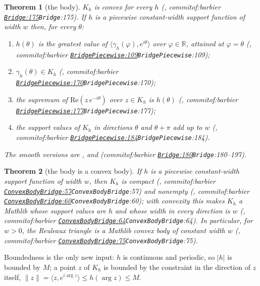 \documentclass[11pt]{article}
\newtheorem{theorem}{Theorem}
\theoremstyle{definition}
\theoremstyle{remark}
\newcommand{\RR}{\mathbb{R}}
\newcommand{\commitof}[1]{\csname commitof:#1\endcsname}
\newcommand{\repo}[1]{https://github.com/jpbald93/#1}
\newcommand{\src}[4]{\ifcsname commitof:#1\endcsname
  \href{\repo{#1}/blob/\commitof{#1}/#2/#3.lean\#L#4}{\texttt{#3}:#4}\else\texttt{#3}:#4\fi}
\begin{document}
\begin{theorem}[the body]\label{thm:body}
$K_h$ is convex for every $h$ (, \src{barbier}{Barbier}{Bridge}{175}). If $h$
is a piecewise constant-width support function of width $w$ then, for every $\theta$:
\begin{enumerate}
\item[(a)] $h(\theta)$ is the greatest value of $\langle\gamma_h(\varphi), e^{i\theta}\rangle$ over
$\varphi\in\RR$, attained at $\varphi = \theta$ (, \src{barbier}{Barbier}{BridgePiecewise}{109});
\item[(b)] $\gamma_h(\theta)\in K_h$ (, \src{barbier}{Barbier}{BridgePiecewise}{170});
\item[(c)] the supremum of $\mathrm{Re}(z\,e^{-i\theta})$ over $z\in K_h$ is $h(\theta)$
(, \src{barbier}{Barbier}{BridgePiecewise}{177});
\item[(d)] the support values of $K_h$ in directions $\theta$ and $\theta+\pi$ add up to $w$
(, \src{barbier}{Barbier}{BridgePiecewise}{184}).
\end{enumerate}
The smooth versions are ,  and
 (\src{barbier}{Barbier}{Bridge}{180}--197).
\end{theorem}

\begin{theorem}[the body is a convex body]\label{thm:convbody}
If $h$ is a piecewise constant-width support function of width $w$, then $K_h$ is compact
(, \src{barbier}{Barbier}{ConvexBodyBridge}{57}) and nonempty
(, \src{barbier}{Barbier}{ConvexBodyBridge}{60}); with
convexity this makes $K_h$ a Mathlib  whose support values are $h$ and whose width
in every direction is $w$ (, \src{barbier}{Barbier}{ConvexBodyBridge}{64}). In particular, for $w>0$, the Reuleaux triangle is a Mathlib convex
body of constant width $w$ (, \src{barbier}{Barbier}{ConvexBodyBridge}{75}).
\end{theorem}

Boundedness is the only new input: $h$ is continuous and periodic, so $\lvert h\rvert$ is bounded by
$M$; a point $z$ of $K_h$ is bounded by the constraint in the direction of $z$ itself,
$\lVert z\rVert = \langle z, e^{i\arg z}\rangle \le h(\arg z) \le M$.
\end{document}
